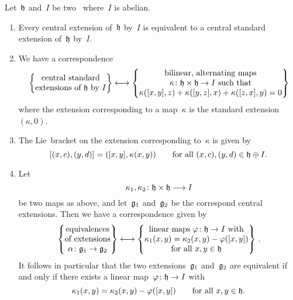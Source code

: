 \begin{theorem}
  \label{structure of central extensions}
  Let~$\mathfrak{h}$ and~$I$ be two~\liealgebras{$\kf$} where~$I$ is abelian.
  \begin{enumerate}
    \item
      Every central extension of~$\mathfrak{h}$ by~$I$ is equivalent to a central standard extension of~$\mathfrak{h}$ by~$I$.
    \item
      We have a {\onetoonetext} correspondence
      \[
        \left\{
          \begin{tabular}{@{}c@{}}
            central standard \\
            extensions of~$\hlie$ by~$I$
          \end{tabular}
        \right\}
        \onetoone
        \left\{
          \begin{tabular}{@{}c@{}}
            bilinear, alternating maps \\
            $\kappa \colon \hlie \times \hlie \to I$ such that \\
            $\kappa([x,y], z) + \kappa([y,z], x) + \kappa([z, x], y) = 0$
          \end{tabular}
        \right\}
      \]
      where the extension corresponding to a map~$\kappa$ is the standard extension~$(\kappa, 0)$.
    \item
      The Lie~bracket on the extension corresponding to~$\kappa$ is given by
      \[
        [ (x,c), (y,d) ]
        =
        ( [x,y], \kappa(x,y) )
        \qquad
        \text{for all~$(x,c), (y,d) \in \mathfrak{h} \oplus I$.}
      \]
    \item
      Let
      \[
        \kappa_1, \kappa_2
        \colon
        \hlie \times \hlie
        \to
        I
      \]
      be two maps as above, and let~$\mathfrak{g}_1$ and~$\mathfrak{g}_2$ be the correspond central extensions.
      Then we have a {\onetoonetext} correspondence given by
      \[
        \left\{
          \begin{tabular}{@{}c@{}}
            equivalences \\ of extensions \\
            $\alpha \colon \glie_1 \to \glie_2$
          \end{tabular}
        \right\}
        \onetoone
        \left\{
          \begin{tabular}{@{}c@{}}
            linear maps~$\varphi \colon \hlie \to I$ with \\
            $\kappa_1(x,y) = \kappa_2(x,y) - \varphi([x,y])$ \\
            for all~$x, y \in \hlie$
          \end{tabular}
        \right\} \,.
      \]
      It follows in particular that the two extensions~$\mathfrak{g}_1$ and~$\mathfrak{g}_2$ are equivalent if and only if there exists a linear map~$\varphi \colon \hlie \to I$ with
      \[
        \kappa_1(x,y)
        =
        \kappa_2(x,y)
        -
        \varphi([x,y])
        \qquad
        \text{for all~$x, y \in \mathfrak{h}$.}
      \]
  \end{enumerate}
\end{theorem}


